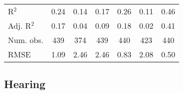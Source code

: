 \documentclass[fullpage]{paper}
\begin{document}
\begin{center}
\begin{longtable}{l c c c c c c }
\hline
R$^2$       & 0.24          & 0.14         & 0.17          & 0.26         & 0.11          & 0.46          \\
Adj. R$^2$  & 0.17          & 0.04         & 0.09          & 0.18         & 0.02          & 0.41          \\
Num. obs.   & 439           & 374          & 439           & 440          & 423           & 440           \\
RMSE        & 1.09          & 2.46         & 2.46          & 0.83         & 2.08          & 0.50          \\
\end{longtable}
\end{center}
\subsection{ Hearing }
\end{document}
